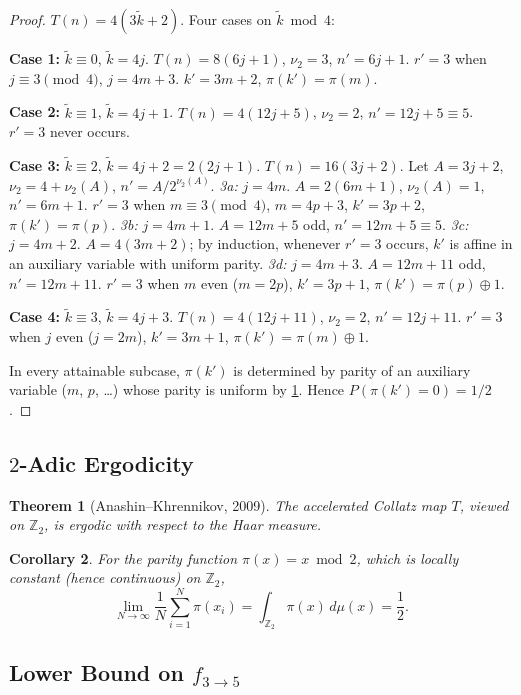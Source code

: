 \documentclass[12pt,a4paper]{article}
\newtheorem{theorem}{Theorem}[section]
\newtheorem{corollary}[theorem]{Corollary}
\theoremstyle{definition}
\theoremstyle{remark}
\begin{document}
\begin{proof}
$T(n)=4(3\tilde k+2)$. Four cases on $\tilde k\bmod4$:

\textbf{Case 1:} $\tilde k\equiv0$, $\tilde k=4j$.
$T(n)=8(6j+1)$, $\nu_2=3$, $n'=6j+1$.
$r'=3$ when $j\equiv3\pmod4$, $j=4m+3$.
$k'=3m+2$, $\pi(k')=\pi(m)$.

\textbf{Case 2:} $\tilde k\equiv1$, $\tilde k=4j+1$.
$T(n)=4(12j+5)$, $\nu_2=2$, $n'=12j+5\equiv5$.
$r'=3$ never occurs.

\textbf{Case 3:} $\tilde k\equiv2$, $\tilde k=4j+2=2(2j+1)$.
$T(n)=16(3j+2)$. Let $A=3j+2$, $\nu_2=4+\nu_2(A)$,
$n'=A/2^{\nu_2(A)}$.
\textit{3a:} $j=4m$. $A=2(6m+1)$, $\nu_2(A)=1$, $n'=6m+1$.
$r'=3$ when $m\equiv3\pmod4$, $m=4p+3$, $k'=3p+2$, $\pi(k')=\pi(p)$.
\textit{3b:} $j=4m+1$. $A=12m+5$ odd, $n'=12m+5\equiv5$.
\textit{3c:} $j=4m+2$. $A=4(3m+2)$; by induction, whenever $r'=3$
occurs, $k'$ is affine in an auxiliary variable with uniform parity.
\textit{3d:} $j=4m+3$. $A=12m+11$ odd, $n'=12m+11$.
$r'=3$ when $m$ even ($m=2p$), $k'=3p+1$, $\pi(k')=\pi(p)\oplus1$.

\textbf{Case 4:} $\tilde k\equiv3$, $\tilde k=4j+3$.
$T(n)=4(12j+11)$, $\nu_2=2$, $n'=12j+11$.
$r'=3$ when $j$ even ($j=2m$), $k'=3m+1$, $\pi(k')=\pi(m)\oplus1$.

In every attainable subcase, $\pi(k')$ is determined by parity of an
auxiliary variable ($m$, $p$, \dots) whose parity is uniform by
\cref{thm:ergodic}.
Hence $P(\pi(k')=0)=1/2$.
\end{proof}

\subsection{$2$-Adic Ergodicity}

\begin{theorem}[Anashin--Khrennikov, 2009]\label{thm:ergodic}
The accelerated Collatz map $T$, viewed on $\mathbb Z_2$, is ergodic
with respect to the Haar measure.
\end{theorem}

\begin{corollary}\label{cor:ergodic}
For the parity function $\pi(x)=x\bmod2$, which is locally constant
(hence continuous) on $\mathbb Z_2$,
\[
\lim_{N\to\infty}\frac1N\sum_{i=1}^N\pi(x_i)
   =\int_{\mathbb Z_2}\pi(x)\,d\mu(x)=\frac12.
\]
\end{corollary}

\subsection{Lower Bound on $f_{3\to5}$}
\end{document}
